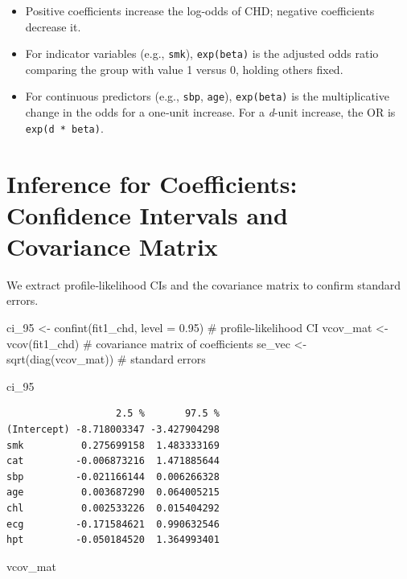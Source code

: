 \documentclass[
  letterpaper,
  DIV=11,
  numbers=noendperiod]{scrreprt}
\newenvironment{Shaded}{\begin{snugshade}}{\end{snugshade}}
\newcommand{\AttributeTok}[1]{\textcolor[rgb]{0.40,0.45,0.13}{#1}}
\newcommand{\CommentTok}[1]{\textcolor[rgb]{0.37,0.37,0.37}{#1}}
\newcommand{\FloatTok}[1]{\textcolor[rgb]{0.68,0.00,0.00}{#1}}
\newcommand{\FunctionTok}[1]{\textcolor[rgb]{0.28,0.35,0.67}{#1}}
\newcommand{\NormalTok}[1]{\textcolor[rgb]{0.00,0.23,0.31}{#1}}
\newcommand{\OtherTok}[1]{\textcolor[rgb]{0.00,0.23,0.31}{#1}}
\providecommand{\tightlist}{%
  \setlength{\itemsep}{0pt}\setlength{\parskip}{0pt}}\usepackage{longtable,booktabs,array}
\begin{document}
\begin{itemize}
\tightlist
\item
  Positive coefficients increase the log-odds of CHD; negative
  coefficients decrease it.
\item
  For indicator variables (e.g., \texttt{smk}), \texttt{exp(beta)} is
  the adjusted odds ratio comparing the group with value 1 versus 0,
  holding others fixed.
\item
  For continuous predictors (e.g., \texttt{sbp}, \texttt{age}),
  \texttt{exp(beta)} is the multiplicative change in the odds for a
  one‑unit increase. For a \emph{d}-unit increase, the OR is
  \texttt{exp(d\ *\ beta)}.
\end{itemize}

\section{Inference for Coefficients: Confidence Intervals and Covariance
Matrix}\label{inference-for-coefficients-confidence-intervals-and-covariance-matrix}

We extract profile‑likelihood CIs and the covariance matrix to confirm
standard errors.

\begin{Shaded}
\begin{Highlighting}[]
\NormalTok{ci\_95 }\OtherTok{\textless{}{-}} \FunctionTok{confint}\NormalTok{(fit1\_chd, }\AttributeTok{level =} \FloatTok{0.95}\NormalTok{)     }\CommentTok{\# profile{-}likelihood CI}
\NormalTok{vcov\_mat }\OtherTok{\textless{}{-}} \FunctionTok{vcov}\NormalTok{(fit1\_chd)                    }\CommentTok{\# covariance matrix of coefficients}
\NormalTok{se\_vec   }\OtherTok{\textless{}{-}} \FunctionTok{sqrt}\NormalTok{(}\FunctionTok{diag}\NormalTok{(vcov\_mat))          }\CommentTok{\# standard errors}

\NormalTok{ci\_95}
\end{Highlighting}
\end{Shaded}

\begin{verbatim}
                   2.5 %       97.5 %
(Intercept) -8.718003347 -3.427904298
smk          0.275699158  1.483333169
cat         -0.006873216  1.471885644
sbp         -0.021166144  0.006266328
age          0.003687290  0.064005215
chl          0.002533226  0.015404292
ecg         -0.171584621  0.990632546
hpt         -0.050184520  1.364993401
\end{verbatim}

\begin{Shaded}
\begin{Highlighting}[]
\NormalTok{vcov\_mat}
\end{Highlighting}
\end{Shaded}
\end{document}
